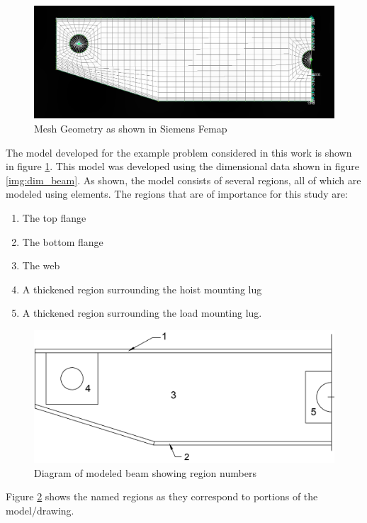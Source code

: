 \begin{figure}
\includegraphics[width=\textwidth]{img/mesh_geom.png}
\caption{Mesh Geometry as shown in Siemens Femap}
\label{img:mesh_geom}
\end{figure}

The model developed for the example problem considered in this work is shown in figure \ref{img:mesh_geom}. This model was developed using the dimensional data shown in figure \ref{img:dim_beam}. As shown, the model consists of several regions, all of which are modeled using  elements. The regions that are of importance for this study are: 

\begin{enumerate}
  \item The top flange
  \item The bottom flange
  \item The web
  \item A thickened region surrounding the hoist mounting lug
  \item A thickened region surrounding the load mounting lug. 
\end{enumerate}

\begin{figure}
\includegraphics[width=\textwidth]{img/numbered_geom.png}
\caption{Diagram of modeled beam showing region numbers}
\label{img:num_geom}
\end{figure}

Figure \ref{img:num_geom} shows the named regions as they correspond to portions of the model/drawing. 

